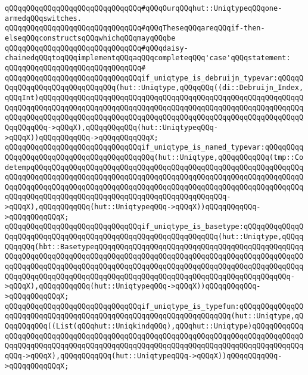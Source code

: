 \newline
\verb|qQQqqQQqqQQqqQQqqQQqqQQqqQQqqQQq#qQQqOurqQQqhut::UniqtypeqQQqone-armedqQQqswitches.|\newline
\verb|qQQqqQQqqQQqqQQqqQQqqQQqqQQqqQQq#qQQqTheseqQQqareqQQqif-then-elseqQQqconstructsqQQqwhichqQQqmayqQQqbe|\newline
\verb|qQQqqQQqqQQqqQQqqQQqqQQqqQQqqQQq#qQQqdaisy-chainedqQQqtoqQQqimplementqQQqaqQQqcompleteqQQq'case'qQQqstatement:|\newline
\verb|qQQqqQQqqQQqqQQqqQQqqQQqqQQqqQQq#|\newline
\verb|qQQqqQQqqQQqqQQqqQQqqQQqqQQqqQQqif_uniqtype_is_debruijn_typevar:qQQqqQQqqQQqqQQqqQQqqQQqqQQqqQQq(hut::Uniqtype,qQQqqQQq((di::Debruijn_Index,qQQqInt)qQQqqQQqqQQqqQQqqQQqqQQqqQQqqQQqqQQqqQQqqQQqqQQqqQQqqQQqqQQqqQQqqQQqqQQqqQQqqQQqqQQqqQQqqQQqqQQqqQQqqQQqqQQqqQQqqQQqqQQqqQQqqQQqqQQqqQQqqQQqqQQqqQQqqQQqqQQqqQQqqQQqqQQqqQQqqQQqqQQqqQQqqQQqqQQqqQQqqQQqqQQqqQQqqQQq->qQQqX),qQQqqQQqqQQq(hut::UniqtypeqQQq->qQQqX))qQQqqQQqqQQq->qQQqqQQqqQQqX;|\newline
\verb|qQQqqQQqqQQqqQQqqQQqqQQqqQQqqQQqif_uniqtype_is_named_typevar:qQQqqQQqqQQqqQQqqQQqqQQqqQQqqQQqqQQqqQQqqQQq(hut::Uniqtype,qQQqqQQqqQQq(tmp::CodetempqQQqqQQqqQQqqQQqqQQqqQQqqQQqqQQqqQQqqQQqqQQqqQQqqQQqqQQqqQQqqQQqqQQqqQQqqQQqqQQqqQQqqQQqqQQqqQQqqQQqqQQqqQQqqQQqqQQqqQQqqQQqqQQqqQQqqQQqqQQqqQQqqQQqqQQqqQQqqQQqqQQqqQQqqQQqqQQqqQQqqQQqqQQqqQQqqQQqqQQqqQQqqQQqqQQqqQQqqQQqqQQqqQQqqQQqqQQqqQQqqQQqqQQqqQQqqQQq->qQQqX),qQQqqQQqqQQq(hut::UniqtypeqQQq->qQQqX))qQQqqQQqqQQq->qQQqqQQqqQQqX;|\newline
\verb|qQQqqQQqqQQqqQQqqQQqqQQqqQQqqQQqif_uniqtype_is_basetype:qQQqqQQqqQQqqQQqqQQqqQQqqQQqqQQqqQQqqQQqqQQqqQQqqQQqqQQqqQQqqQQq(hut::Uniqtype,qQQqqQQqqQQq(hbt::BasetypeqQQqqQQqqQQqqQQqqQQqqQQqqQQqqQQqqQQqqQQqqQQqqQQqqQQqqQQqqQQqqQQqqQQqqQQqqQQqqQQqqQQqqQQqqQQqqQQqqQQqqQQqqQQqqQQqqQQqqQQqqQQqqQQqqQQqqQQqqQQqqQQqqQQqqQQqqQQqqQQqqQQqqQQqqQQqqQQqqQQqqQQqqQQqqQQqqQQqqQQqqQQqqQQqqQQqqQQqqQQqqQQqqQQqqQQqqQQqqQQqqQQqqQQqqQQqqQQq->qQQqX),qQQqqQQqqQQq(hut::UniqtypeqQQq->qQQqX))qQQqqQQqqQQq->qQQqqQQqqQQqX;|\newline
\verb|qQQqqQQqqQQqqQQqqQQqqQQqqQQqqQQqif_uniqtype_is_typefun:qQQqqQQqqQQqqQQqqQQqqQQqqQQqqQQqqQQqqQQqqQQqqQQqqQQqqQQqqQQqqQQqqQQq(hut::Uniqtype,qQQqqQQqqQQq((List(qQQqhut::UniqkindqQQq),qQQqhut::Uniqtype)qQQqqQQqqQQqqQQqqQQqqQQqqQQqqQQqqQQqqQQqqQQqqQQqqQQqqQQqqQQqqQQqqQQqqQQqqQQqqQQqqQQqqQQqqQQqqQQqqQQqqQQqqQQqqQQqqQQqqQQqqQQqqQQqqQQqqQQqqQQqqQQqqQQqqQQqqQQq->qQQqX),qQQqqQQqqQQq(hut::UniqtypeqQQq->qQQqX))qQQqqQQqqQQq->qQQqqQQqqQQqX;|\newline
